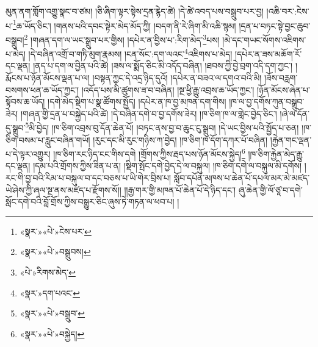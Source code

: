 མུན་ནག་གློག་འགྱུ་སྣང་བ་ཙམ། །ཅི་ཞིག་ལྟར་སྟེས་དྲན་རྙེད་ཚེ། །དེ་ཚེ་འབད་པས་བསྒྲུབ་པར་བྱ། །འཆི་བར་:ངེས་པ་\footnote{«སྣར་»«པེ་»ངེས་པར་}ཆ་ཡོད་ཅིང་། །གནས་པའི་དབང་སྟེར་མེད་མོད་ཀྱི། །བདག་ནི་རེ་ཞིག་མི་འཆི་སྙམ། །དྲན་པ་བཏང་སྟེ་བྱང་ཆུབ་བསྒྲུབ།\footnote{«སྣར་»«པེ་»བསྒྲུབས།} །གཞན་དག་ལ་ཡང་སྒྲུབ་པར་གྱིས། །དཔེར་ན་བྱིས་པ་:རིག་མེད་\footnote{«པེ་»རིགས་མེད་}པས། །མེ་དང་གཡང་སོགས་འཇིགས་པ་མེད། །དེ་བཞིན་འགྲོ་བ་གཏི་མུག་རྣམས། །ངན་སོང་:དག་ལའང་\footnote{«སྣར་»དག་པའང་}འཇིགས་པ་མེད། །དཔེར་ན་ཟས་མཆོག་རོ་དང་ལྡན། །ནད་པ་དག་ལ་བྱིན་པའི་ཚེ། །ཟས་ལ་སྨོད་ཅིང་མི་འདོད་བཞིན། །ཐབས་ཀྱི་བྱེ་བྲག་འདི་དག་ཀྱང་། །རྨོངས་པ་ཉོན་མོངས་ལྡན་པ་ལ། །བསྟན་ཀྱང་དེ་འདྲ་ཉིད་དུའོ། །དཔེར་ན་བཟའ་ལ་དགའ་བའི་མི། །ཟོས་བརླག་བསགས་ཕན་ཆ་ཡོད་ཀྱང་། །འདོད་པས་མི་ཚུགས་ཟ་བ་བཞིན། །སྔ་ཕྱི་རྒྱུ་འབྲས་ཆ་ཡོད་ཀྱང་། །ཉོན་མོངས་ཞེན་པ་སྟོབས་ཆ་ཡོད། །དགེ་མེད་སྡིག་པ་སྣ་ཚོགས་སྤྱོད། །དཔེར་ན་ཁ་བྱ་མཁན་དག་གིས། །ཁ་ལ་བྱ་དགོས་ཀུན་བསྒྲུབ་ཟེར། །གཞན་གྱི་དྲན་པ་བསྐྱེད་པའི་ཚེ། །དེ་བཞིན་དགེ་བ་བྱ་དགོས་ཟེར། །ཁ་ཅིག་ཁ་ལ་གླེང་བྱེད་ཅིང་། །ཞེ་ལ་དོན་དུ་སྒྲུབ་\footnote{«སྣར་»«པེ་»བསྒྲུབ་}མི་བྱེད། །ཁ་ཅིག་འབྲས་བུ་དོན་ཆེན་པོ། །བཏང་ནས་བྱ་བ་ཆུང་ངུ་སྒྲུབ། །དེ་ཡང་བྱིས་པའི་སྤྱོད་པ་ཅན། །ཁ་ཅིག་བསམ་པ་རླུང་བཞིན་གཡོ། །རུང་དང་མི་རུང་གཉིས་ཀ་བྱེད། །ཁ་ཅིག་ཁ་དོག་དཀར་པོ་བཞིན། །རྐྱེན་གང་ལྡན་པ་དེ་ལྟར་འགྱུར། །ཁ་ཅིག་རང་ཉིད་ངང་གིས་དགེ །གྲོགས་ཀྱིས་རྦད་པས་ཉོན་མོངས་སྐྱེད།\footnote{«སྣར་»«པེ་»བསྐྱེད།} །ཁ་ཅིག་རྐྱེན་མེད་རྒྱུ་དང་ལྡན། །དམ་པའི་གྲོགས་ཀྱིས་ཟིན་པ་ན། །སྡིག་སྤོང་དགེ་བྱེད་དེ་ལ་བསྐུལ། །ཁ་ཅིག་དགེ་ལ་བསྐུལ་མི་དགོས། །རང་གི་བྱ་བའི་རིམ་པ་བསྐུལ་བ་དང་བཅས་པ་ཡི་གེར་བྲིས་པ། སློབ་དཔོན་མཁས་པ་ཆེན་པོ་དཔལ་མར་མེ་མཛད་ཡེ་ཤེས་ཀྱི་ཞལ་སྔ་ནས་མཛད་པ་རྫོགས་སོ།། །།རྒྱ་གར་གྱི་མཁན་པོ་ཆེན་པོ་དེ་ཉིད་དང་། ཞུ་ཆེན་གྱི་ལོ་ཙཱ་བ་དགེ་སློང་དགེ་བའི་བློ་གྲོས་ཀྱིས་བསྒྱུར་ཅིང་ཞུས་ཏེ་གཏན་ལ་ཕབ་པ། ། 